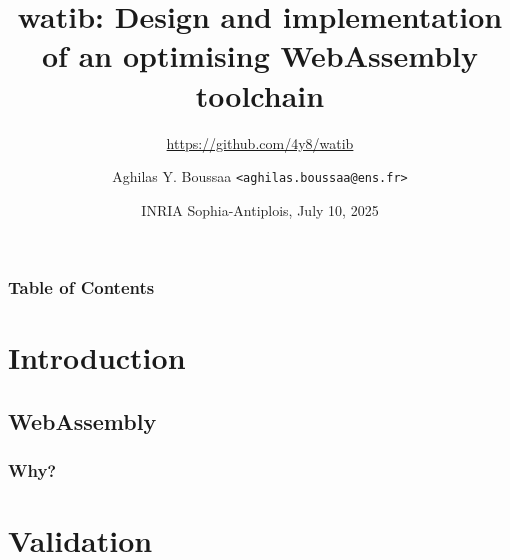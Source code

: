 \documentclass{beamer}
\author{Aghilas Y. Boussaa \texttt{<aghilas.boussaa@ens.fr>}}
\title{watib: Design and implementation of an optimising WebAssembly toolchain}
\subtitle{\url{https://github.com/4y8/watib}}
\institute{École normale supérieure}
\begin{document}
\frame{\titlepage}
\date{INRIA Sophia-Antiplois, July 10, 2025}
\begin{frame}
\frametitle{Table of Contents}
\tableofcontents
\end{frame}

\section{Introduction}
\subsection{WebAssembly}
\begin{frame}
  \frametitle{Why?}
\end{frame}
\section{Validation}
\end{document}
